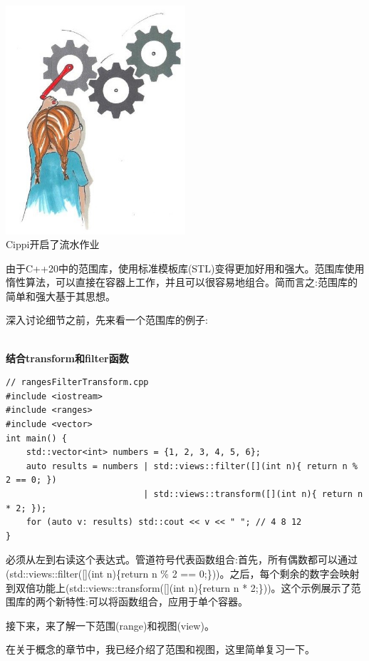 \begin{center}
\includegraphics[width=0.5\textwidth]{content/3/chapter5/images/2.png}\\
Cippi开启了流水作业
\end{center}

由于C++20中的范围库，使用标准模板库(STL)变得更加好用和强大。范围库使用惰性算法，可以直接在容器上工作，并且可以很容易地组合。简而言之:范围库的简单和强大基于其思想。

深入讨论细节之前，先来看一个范围库的例子:

\hspace*{\fill} \\ %
\noindent
\textbf{结合transform和filter函数}
\begin{lstlisting}[style=styleCXX]
// rangesFilterTransform.cpp
#include <iostream>
#include <ranges>
#include <vector>
int main() {
	std::vector<int> numbers = {1, 2, 3, 4, 5, 6};
	auto results = numbers | std::views::filter([](int n){ return n % 2 == 0; })
						   | std::views::transform([](int n){ return n * 2; });
	for (auto v: results) std::cout << v << " "; // 4 8 12
}
\end{lstlisting}

必须从左到右读这个表达式。管道符号代表函数组合:首先，所有偶数都可以通过(std::views::filter([](int n)\{return n \% 2 == 0;\}))。之后，每个剩余的数字会映射到双倍功能上(std::views::transform([](int n)\{return n * 2;\}))。这个示例展示了范围库的两个新特性:可以将函数组合，应用于单个容器。

接下来，来了解一下范围(range)和视图(view)。


在关于概念的章节中，我已经介绍了范围和视图，这里简单复习一下。

